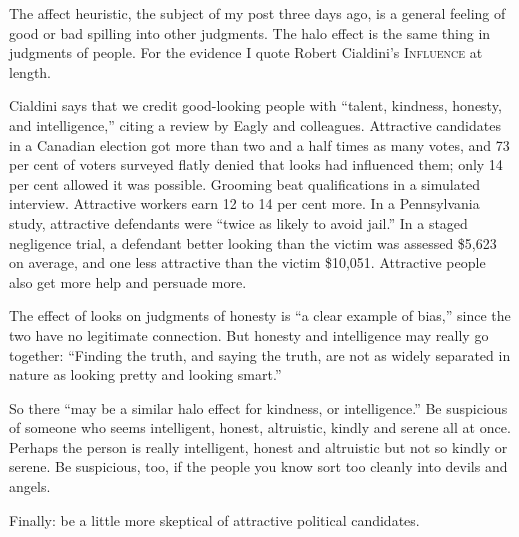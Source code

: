 
The affect heuristic, the subject of my post three days ago, is a general feeling of good or bad spilling into other judgments. The halo effect is the same thing in judgments of people. For the evidence I quote Robert Cialdini's \textsc{Influence} at length.

Cialdini says that we credit good-looking people with ``talent, kindness, honesty, and intelligence,'' citing a review by Eagly and colleagues.  Attractive candidates in a Canadian election got more than two and a half times as many votes, and 73 per cent of voters surveyed flatly denied that looks had influenced them; only 14 per cent allowed it was possible.  Grooming beat qualifications in a simulated interview. Attractive workers earn 12 to 14 per cent more. In a Pennsylvania study, attractive defendants were ``twice as likely to avoid jail.''  In a staged negligence trial, a defendant better looking than the victim was assessed \$5,623 on average, and one less attractive than the victim \$10,051. Attractive people also get more help and persuade more.

The effect of looks on judgments of honesty is ``a clear example of bias,'' since the two have no legitimate connection. But honesty and intelligence may really go together: ``Finding the truth, and saying the truth, are not as widely separated in nature as looking pretty and looking smart.''

So there ``may be a similar halo effect for kindness, or intelligence.'' Be suspicious of someone who seems intelligent, honest, altruistic, kindly and serene all at once. Perhaps the person is really intelligent, honest and altruistic but not so kindly or serene. Be suspicious, too, if the people you know sort too cleanly into devils and angels. 

Finally: be a little more skeptical of attractive political candidates.
